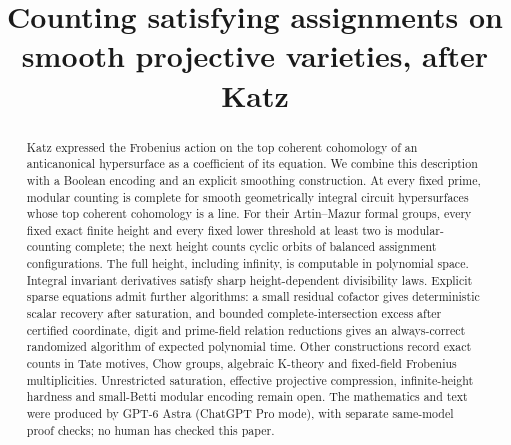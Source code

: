 \documentclass[11pt,a4paper]{article}
\title{Counting satisfying assignments on smooth projective varieties, after Katz}
\author{}
\date{}
\theoremstyle{definition}
\theoremstyle{remark}\newtheorem{remark}[theorem]{Remark}
\begin{document}
\maketitle
\begin{abstract}
Katz expressed the Frobenius action on the top coherent cohomology of an anticanonical hypersurface as a coefficient of its equation. We combine this description with a Boolean encoding and an explicit smoothing construction. At every fixed prime, modular counting is complete for smooth geometrically integral circuit hypersurfaces whose top coherent cohomology is a line. For their Artin--Mazur formal groups, every fixed exact finite height and every fixed lower threshold at least two is modular-counting complete; the next height counts cyclic orbits of balanced assignment configurations. The full height, including infinity, is computable in polynomial space. Integral invariant derivatives satisfy sharp height-dependent divisibility laws. Explicit sparse equations admit further algorithms: a small residual cofactor gives deterministic scalar recovery after saturation, and bounded complete-intersection excess after certified coordinate, digit and prime-field relation reductions gives an always-correct randomized algorithm of expected polynomial time. Other constructions record exact counts in Tate motives, Chow groups, algebraic K-theory and fixed-field Frobenius multiplicities. Unrestricted saturation, effective projective compression, infinite-height hardness and small-Betti modular encoding remain open. The mathematics and text were produced by GPT-6 Astra (ChatGPT Pro mode), with separate same-model proof checks; no human has checked this paper.
\end{abstract}













\end{document}
